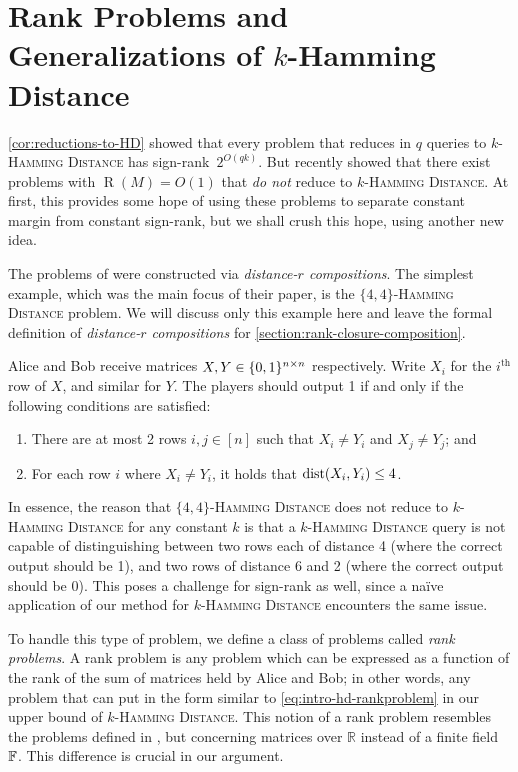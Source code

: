 \documentclass[conference]{IEEEtran}
\DeclareMathOperator{\Rand}{R}
\newcommand{\R}{\mathbb{R}}
\begin{document}
\section{Rank Problems and Generalizations of \texorpdfstring{$k$}{k}-Hamming Distance}
\label{section:rank-problems}

\cref{cor:reductions-to-HD} showed that every problem that reduces in $q$ queries to \textsc{$k$-Hamming Distance} has sign-rank~$2^{O(qk)}$. But \cite{FGHH25} recently showed that there
exist problems with $\Rand(M) = O(1)$ that \emph{do not} reduce to
\textsc{$k$-Hamming Distance}. At first, this provides some hope of using these
problems to separate constant margin from constant sign-rank, but we shall crush
this hope, using another new idea.

The problems of \cite{FGHH25} were constructed via \emph{distance-$r$
compositions}. The simplest example, which was the main focus of their paper, is
the \textsc{$\{4,4\}$-Hamming Distance} problem. We will discuss only this
example here and leave the formal definition of \emph{distance-$r$ compositions} for
\cref{section:rank-closure-composition}.

\begin{example}
\label{ex:44-hamming-distance}
Alice and Bob receive matrices $X, Y \in \{0,1\}^{n \times n}$ respectively. Write
$X_i$ for the $i^\mathrm{th}$ row of $X$, and similar for $Y$. The players
should output 1 if and only if the following conditions are satisfied:
\begin{enumerate}
    \item There are at most 2 rows $i,j \in [n]$ such that $X_i \neq Y_i$ and $X_j \neq Y_j$; and
    \item For each row $i$ where $X_i \neq Y_i$, it holds that $\operatorname{dist}(X_i, Y_i) \leq 4$.
\end{enumerate}
\end{example}
In essence, the reason that \textsc{$\{4,4\}$-Hamming Distance} does not reduce
to \textsc{$k$-Hamming Distance} for any constant $k$ is that a
\textsc{$k$-Hamming Distance} query is not capable of distinguishing between two
rows each of distance 4 (where the correct output should be 1), and two rows of
distance 6 and 2 (where the correct output should be 0). This poses a challenge
for sign-rank as well, since a na\"ive application of our method for
\textsc{$k$-Hamming Distance} encounters the same issue.

To handle this type of problem, we define a class of
problems called \emph{rank problems}. A rank problem is any problem which can be
expressed as a function of the rank of the sum of matrices held by Alice and Bob; in other words, any problem that can
put in the form similar to \cref{eq:intro-hd-rankproblem} in our upper bound of
\textsc{$k$-Hamming Distance}. This notion of a rank problem resembles the problems defined in \cite{SS24}, but concerning matrices over $\R$ instead of a finite field $\mathbb{F}$. This difference is crucial in our argument.
\end{document}
